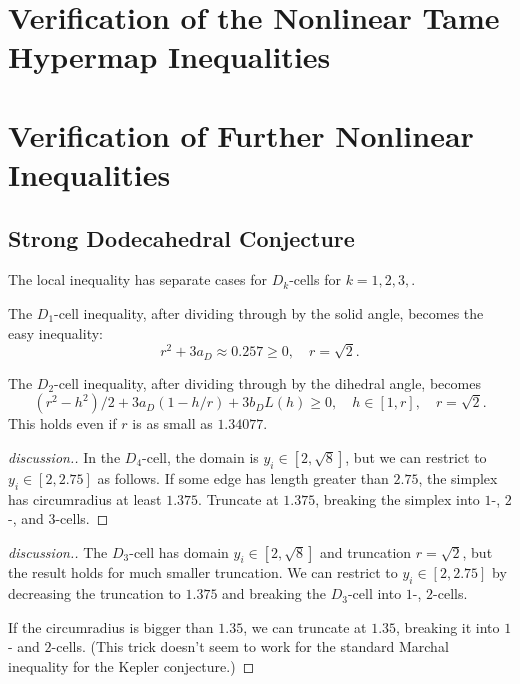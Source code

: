 \chapter{Verification of the Nonlinear Tame Hypermap Inequalities}

\chapter{Verification of Further Nonlinear Inequalities}

\section{Strong Dodecahedral Conjecture}


\begin{calculation}
The local inequality  has separate cases for $D_k$-cells for
$k=1,2,3,$.
\end{calculation}

The $D_1$-cell inequality, after dividing through by the solid angle, becomes
the easy inequality:
\[
r^2 + 3 a_D \approx 0.257 \ge 0,\quad r = \sqrt2.
\]

The $D_2$-cell inequality, after dividing through by the dihedral angle, becomes
\[
 (r^2-h^2)/2 + 3 a_D (1-h/r)  + 3 b_D L(h) \ge 0, \quad h\in [1,r],\quad r = \sqrt2.
\]
This holds even if $r$ is as small as $1.34077$.

\begin{calculation}
\end{calculation}

\begin{proof}[discussion.]
In the $D_4$-cell, the domain is
$y_i\in[2,\sqrt8]$, but we can restrict to $y_i\in[2,2.75]$ as follows.
If some edge has length greater than $2.75$, the simplex has
circumradius at least $1.375$.  Truncate at $1.375$, breaking the
simplex into $1$-, $2$-, and $3$-cells.
\end{proof}

\begin{calculation}
\end{calculation}

\begin{proof}[discussion.]
The $D_3$-cell  has domain $y_i\in[2,\sqrt8]$ and
truncation $r=\sqrt2$, but the result holds for much smaller
truncation.  We can restrict to $y_i\in [2,2.75]$ by decreasing the
truncation to $1.375$ and breaking the $D_3$-cell into $1$-, $2$-cells.

If the circumradius is bigger than $1.35$, we can truncate at $1.35$, breaking
it into $1$- and $2$-cells.  (This trick doesn't seem to work for the standard Marchal
inequality for the Kepler conjecture.)
\end{proof}


